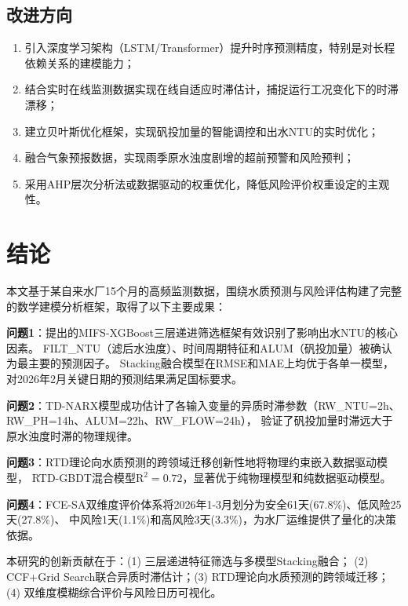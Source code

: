 \documentclass[12pt,a4paper]{ctexart}
\begin{document}
\subsection{改进方向}

\begin{enumerate}[nosep]
    \item 引入深度学习架构（LSTM/Transformer）提升时序预测精度，特别是对长程依赖关系的建模能力；
    \item 结合实时在线监测数据实现在线自适应时滞估计，捕捉运行工况变化下的时滞漂移；
    \item 建立贝叶斯优化框架，实现矾投加量的智能调控和出水NTU的实时优化；
    \item 融合气象预报数据，实现雨季原水浊度剧增的超前预警和风险预判；
    \item 采用AHP层次分析法或数据驱动的权重优化，降低风险评价权重设定的主观性。
\end{enumerate}

\section{结论}

本文基于某自来水厂15个月的高频监测数据，围绕水质预测与风险评估构建了完整的数学建模分析框架，取得了以下主要成果：

\textbf{问题1}：提出的MIFS-XGBoost三层递进筛选框架有效识别了影响出水NTU的核心因素。
FILT\_NTU（滤后水浊度）、时间周期特征和ALUM（矾投加量）被确认为最主要的预测因子。
Stacking融合模型在RMSE和MAE上均优于各单一模型，对2026年2月关键日期的预测结果满足国标要求。

\textbf{问题2}：TD-NARX模型成功估计了各输入变量的异质时滞参数（RW\_NTU=2h、RW\_PH=14h、ALUM=22h、RW\_FLOW=24h），
验证了矾投加量时滞远大于原水浊度时滞的物理规律。

\textbf{问题3}：RTD理论向水质预测的跨领域迁移创新性地将物理约束嵌入数据驱动模型，
RTD-GBDT混合模型$\mathrm{R}^2=0.72$，显著优于纯物理模型和纯数据驱动模型。

\textbf{问题4}：FCE-SA双维度评价体系将2026年1-3月划分为安全61天(67.8\%)、低风险25天(27.8\%)、
中风险1天(1.1\%)和高风险3天(3.3\%)，为水厂运维提供了量化的决策依据。

本研究的创新贡献在于：(1) 三层递进特征筛选与多模型Stacking融合；
(2) CCF+Grid Search联合异质时滞估计；(3) RTD理论向水质预测的跨领域迁移；
(4) 双维度模糊综合评价与风险日历可视化。
\end{document}
